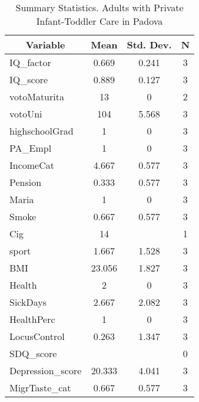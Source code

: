 
\begin{table}[htbp]\centering \caption{Summary Statistics. Adults with Private Infant-Toddler Care in Padova \label{bothAdultasiloPrivPadova}}
\begin{tabular}{l c c  c}\hline\hline
\multicolumn{1}{c}{\textbf{Variable}} & \textbf{Mean}
 & \textbf{Std. Dev.} & \textbf{N}\\ \hline
IQ\_factor & 0.669 & 0.241  & 3\\
IQ\_score & 0.889 & 0.127  & 3\\
votoMaturita & 13 & 0  & 2\\
votoUni & 104 & 5.568  & 3\\
highschoolGrad & 1 & 0  & 3\\
PA\_Empl & 1 & 0  & 3\\
IncomeCat & 4.667 & 0.577  & 3\\
Pension & 0.333 & 0.577  & 3\\
Maria & 1 & 0  & 3\\
Smoke & 0.667 & 0.577  & 3\\
Cig & 14 &   & 1\\
sport & 1.667 & 1.528  & 3\\
BMI & 23.056 & 1.827  & 3\\
Health & 2 & 0  & 3\\
SickDays & 2.667 & 2.082  & 3\\
HealthPerc & 1 & 0  & 3\\
LocusControl & 0.263 & 1.347  & 3\\
SDQ\_score &  &   & 0\\
Depression\_score & 20.333 & 4.041  & 3\\
MigrTaste\_cat & 0.667 & 0.577  & 3\\
\hline\end{tabular}
\end{table}
